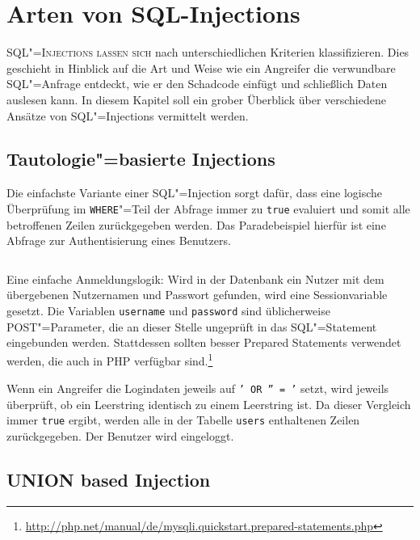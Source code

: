 \chapter{Arten von SQL-Injections}
\lettrine[lines=2]{S}{QL"=Injections lassen sich}  nach unterschiedlichen Kriterien klassifizieren. Dies geschieht in Hinblick auf die Art und Weise wie ein Angreifer die verwundbare SQL"=Anfrage entdeckt, wie er den Schadcode einfügt und schließlich Daten auslesen kann. In diesem Kapitel soll ein grober Überblick über verschiedene Ansätze von SQL"=Injections vermittelt werden.

\section{Tautologie"=basierte Injections}

Die einfachste Variante einer SQL"=Injection sorgt dafür, dass eine logische Überprüfung im \texttt{WHERE}"=Teil der Abfrage immer zu \texttt{true} evaluiert und somit alle betroffenen Zeilen zurückgegeben werden. Das Paradebeispiel hierfür ist eine Abfrage zur Authentisierung eines Benutzers.


\begin{listing}
\begin{margincap}
\inputminted[startinline]{php}{imports/login_1.php}
\caption[login]{Eine einfache Anmeldungslogik: Wird in der Datenbank ein Nutzer mit dem übergebenen Nutzernamen und Passwort gefunden, wird eine Sessionvariable gesetzt. Die Variablen \texttt{username} und \texttt{password} sind üblicherweise POST"=Parameter, die an dieser Stelle ungeprüft in das SQL"=Statement eingebunden werden. Stattdessen sollten besser Prepared Statements verwendet werden, die auch in PHP verfügbar sind.\footnote{\url{http://php.net/manual/de/mysqli.quickstart.prepared-statements.php}} }
\label{lst:login_query}
\end{margincap}
\end{listing}

Wenn ein Angreifer die Logindaten jeweils auf \texttt{' OR '' = '} setzt, wird jeweils überprüft, ob ein Leerstring identisch zu einem Leerstring ist. Da dieser Vergleich immer \texttt{true} ergibt, werden alle in der Tabelle \texttt{users} enthaltenen Zeilen zurückgegeben. Der Benutzer wird eingeloggt.

\section{UNION based Injection}

